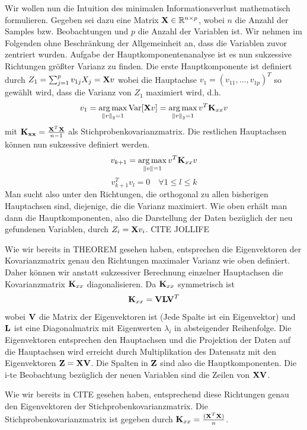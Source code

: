 Wir wollen nun die Intuition des minimalen Informationsverlust mathematisch formulieren. Gegeben sei dazu eine Matrix $\mathbf{X} \in \mathbb{R}^{n\times p}$, wobei $n$ die Anzahl der Samples bzw. Beobachtungen und $p$ die Anzahl der Variablen ist. Wir nehmen im Folgenden ohne Beschränkung der Allgemeinheit an, dass die Variablen zuvor zentriert wurden. Aufgabe der Hauptkomponentenanalyse ist es nun sukzessive Richtungen größter Varianz zu finden. Die erste Hauptkomponente ist definiert durch $Z_1 = \sum_{j=1}^p v_{1j}X_j = \mathbf{X}v$ wobei die Hauptachse $v_1 = (v_{11}, \ldots, v_{1p})^T$ so gewählt wird, dass die Varianz von $Z_1$ maximiert wird, d.h.
$$v_1 = \operatorname*{arg\,max}_{\left\lVert v \right\rVert_2 = 1} \text{Var}[\mathbf{X}v] = \operatorname*{arg\,max}_{\left\lVert v \right\rVert_2 = 1} v^T \mathbf{K}_{xx} v$$
mit $\mathbf{K_{xx}} = \frac{\mathbf{X}^T\mathbf{X}}{n-1}$ als Stichprobenkovarianzmatrix. Die restlichen Hauptachsen können nun sukzessive definiert werden.
$$v_{k+1} = \operatorname*{arg\,max}_{\left\lVert v \right\rVert = 1} v^T \mathbf{K}_{xx} v$$ 
$$v_{k+1}^Tv_l = 0 \quad \forall 1 \leq l \leq k$$
Man sucht also unter den Richtungen, die orthogonal zu allen bisherigen Hauptachsen sind, diejenige, die die Varianz maximiert. Wie oben erhält man dann die Hauptkomponenten, also die Darstellung der Daten bezüglich der neu gefundenen Variablen, durch $Z_i = \mathbf{X}v_i$.
\cite{zou_overview}
CITE JOLLIFE

Wie wir bereits in THEOREM gesehen haben, entsprechen die Eigenvektoren der Kovarianzmatrix genau den Richtungen maximaler Varianz wie oben definiert. Daher können wir anstatt sukzessiver Berechnung einzelner Hauptachsen die Kovarianzmatrix $\mathbf{K}_{xx}$ diagonalisieren. Da $\mathbf{K}_{xx}$ symmetrisch ist
$$\mathbf{K}_{xx} = \mathbf{V} \mathbf{L} \mathbf{V}^T$$
wobei $\mathbf{V}$ die Matrix der Eigenvektoren ist (Jede Spalte ist ein Eigenvektor) und $\mathbf{L}$ ist eine Diagonalmatrix mit Eigenwerten $\lambda_i$ in absteigender Reihenfolge. Die Eigenvektoren entsprechen den Hauptachsen und die Projektion der Daten auf die Hauptachsen wird erreicht durch Multiplikation des Datensatz mit den Eigenvektoren $\mathbf{Z} = \mathbf{X} \mathbf{V}$. Die Spalten in $\mathbf{Z}$ sind also die Hauptkomponenten. Die i-te Beobachtung bezüglich der neuen Variablen sind die Zeilen von $\mathbf{X}\mathbf{V}$.



 Wie wir bereits in CITE gesehen haben, entsprechend diese Richtungen genau den Eigenvektoren der Stichprobenkovarianzmatrix. Die Stichprobenkovarianzmatrix ist gegeben durch $\mathbf{K}_{xx} = \frac{(\mathbf{X}^T\mathbf{X})}{n}$. 
 


